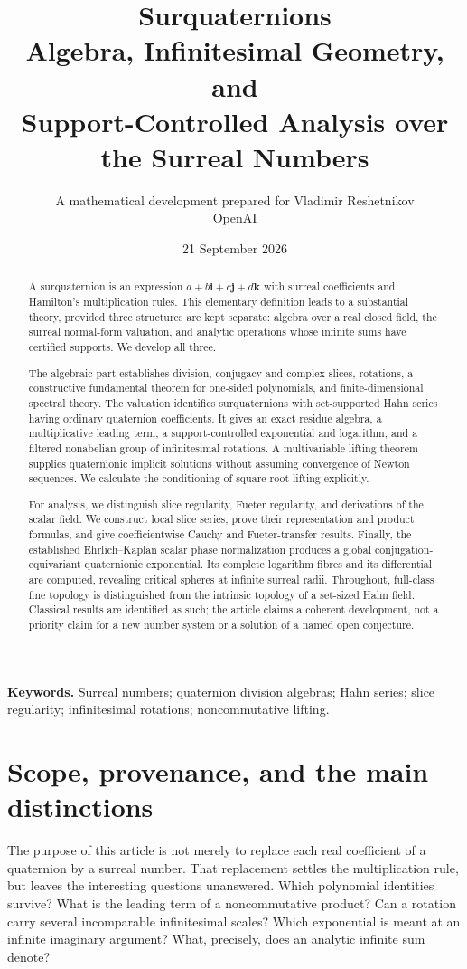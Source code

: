 \documentclass[11pt,letterpaper]{article}
\title{\textbf{Surquaternions}\\[5pt]
\Large Algebra, Infinitesimal Geometry, and\\Support-Controlled Analysis over the Surreal Numbers}
\author{A mathematical development prepared for Vladimir Reshetnikov\\
\small OpenAI}
\date{21 September 2026}
\theoremstyle{definition}
\newcommand{\ii}{\mathbf i}
\newcommand{\jj}{\mathbf j}
\newcommand{\kk}{\mathbf k}
\begin{document}
\maketitle
\begin{abstract}
A surquaternion is an expression $a+b\ii+c\jj+d\kk$ with surreal coefficients
and Hamilton's multiplication rules. This elementary definition leads to a
substantial theory, provided three structures are kept separate: algebra over a
real closed field, the surreal normal-form valuation, and analytic operations
whose infinite sums have certified supports. We develop all three.

The algebraic part establishes division, conjugacy and complex slices,
rotations, a constructive fundamental theorem for one-sided polynomials,
and finite-dimensional spectral theory. The valuation identifies surquaternions
with set-supported Hahn series having ordinary quaternion coefficients. It gives
an exact residue algebra, a multiplicative leading term, a support-controlled
exponential and logarithm, and a filtered nonabelian group of infinitesimal
rotations. A multivariable lifting theorem supplies quaternionic implicit
solutions without assuming convergence of Newton sequences. We calculate the
conditioning of square-root lifting explicitly.

For analysis, we distinguish slice regularity, Fueter regularity, and derivations
of the scalar field. We construct local slice series, prove their representation
and product formulas, and give coefficientwise Cauchy and Fueter-transfer
results. Finally, the established Ehrlich--Kaplan scalar phase normalization
produces a global conjugation-equivariant quaternionic exponential. Its complete
logarithm fibres and its differential are computed, revealing critical spheres
at infinite surreal radii. Throughout, full-class fine topology is distinguished
from the intrinsic topology of a set-sized Hahn field. Classical results are
identified as such; the article claims a coherent development, not a priority
claim for a new number system or a solution of a named open conjecture.
\end{abstract}
\vspace{6pt}
\noindent\textbf{Keywords.} Surreal numbers; quaternion division algebras; Hahn
series; slice regularity; infinitesimal rotations; noncommutative lifting.
\newpage
\tableofcontents
\newpage

\section{Scope, provenance, and the main distinctions}
\label{sec:scope}
The purpose of this article is not merely to replace each real coefficient of a
quaternion by a surreal number. That replacement settles the multiplication
rule, but leaves the interesting questions unanswered. Which polynomial
identities survive? What is the leading term of a noncommutative product? Can a
rotation carry several incomparable infinitesimal scales? Which exponential is
meant at an infinite imaginary argument? What, precisely, does an analytic
infinite sum denote?
\end{document}
